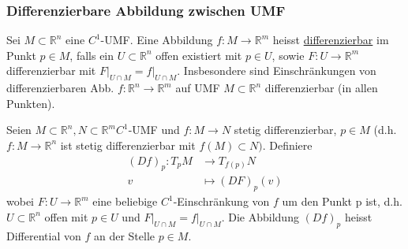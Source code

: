 \documentclass[../main.tex]{subfiles}
\begin{document}
\subsubsection*{Differenzierbare Abbildung zwischen UMF}
Sei $M \subset \mathbb{R}^n$ eine $C^1$-UMF. Eine Abbildung $f : M \to \mathbb{R}^m$ heisst \underline{differenzierbar} im Punkt $p \in M$, falls ein $U \subset \mathbb{R}^n$ offen existiert mit
$p\in U$, sowie $F: U \to \mathbb{R}^m$ differenzierbar mit $F\vert_{U \cap M} = f \vert_{U \cap M}$.
Insbesondere sind Einschränkungen von differenzierbaren Abb. $f:\mathbb{R}^n \to \mathbb{R}^m$ auf UMF $M \subset \mathbb{R}^n$ differenzierbar (in allen Punkten).

\begin{definition}
Seien $M \subset \mathbb{R}^n, N \subset \mathbb{R}^m C^1$-UMF und $f: M \to N$ stetig differenzierbar,
$p \in M$ (d.h. $f : M \to \mathbb{R}^n$ ist stetig differenzierbar mit $f(M) \subset N)$. Definiere
\begin{align*}
    (Df)_p : T_pM & \to T_{f(p)}N \\
    v & \mapsto (DF)_p(v)
\end{align*}
wobei $F : U \to \mathbb{R}^m$ eine beliebige $C^1$-Einschränkung von $f$ um den Punkt p ist, d.h.
$U \subset \mathbb{R}^n$ offen mit $p \in U$ und $F \vert_{U \cap M} = f \vert_{U \cap M}$. Die Abbildung $(Df)_p$ heisst Differential von $f$ an der Stelle $p \in M$.
\end{definition}
\end{document}

